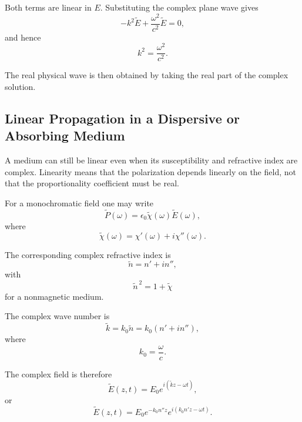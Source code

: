 \documentclass[11pt]{article}
\begin{document}
Both terms are linear in \(E\).  Substituting the complex plane wave gives
\begin{equation}
-k^2\tilde{E}
+
\frac{\omega^2}{c^2}\tilde{E}
=
0,
\end{equation}
and hence
\begin{equation}
k^2=\frac{\omega^2}{c^2}.
\end{equation}

The real physical wave is then obtained by taking the real part of the complex solution.

\subsection{Linear Propagation in a Dispersive or Absorbing Medium}

A medium can still be linear even when its susceptibility and refractive index are complex.  Linearity means that the polarization depends linearly on the field, not that the proportionality coefficient must be real.

For a monochromatic field one may write
\begin{equation}
\tilde{P}(\omega)
=
\epsilon_0\tilde{\chi}(\omega)\tilde{E}(\omega),
\end{equation}
where
\begin{equation}
\tilde{\chi}(\omega)
=
\chi'(\omega)+i\chi''(\omega).
\end{equation}

The corresponding complex refractive index is
\begin{equation}
\tilde{n}
=
n'+in'',
\end{equation}
with
\begin{equation}
\tilde{n}^{\,2}
=
1+\tilde{\chi}
\end{equation}
for a nonmagnetic medium.

The complex wave number is
\begin{equation}
\tilde{k}
=
k_0\tilde{n}
=
k_0(n'+in''),
\end{equation}
where
\begin{equation}
k_0=\frac{\omega}{c}.
\end{equation}

The complex field is therefore
\begin{equation}
\tilde{E}(z,t)
=
E_0 e^{i(\tilde{k}z-\omega t)},
\end{equation}
or
\begin{equation}
\tilde{E}(z,t)
=
E_0
e^{-k_0n''z}
e^{i(k_0n'z-\omega t)}.
\end{equation}
\end{document}
